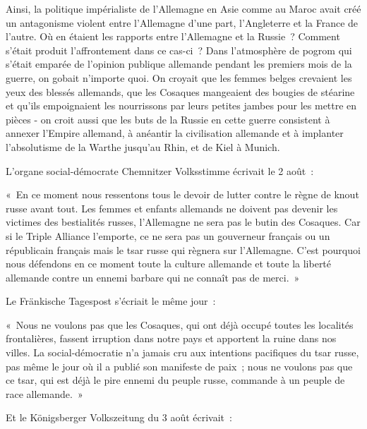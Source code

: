 \documentclass[french,twoside]{book} %
\newenvironment{quoteblock}%
  {\begin{quoting}}
  {\end{quoting}}
\newenvironment{quotebar}{%
    \def\FrameCommand{{\color{rubric!10!}\vrule width 0.5em} \hspace{0.9em}}%
    \def\OuterFrameSep{\itemsep} %
    \MakeFramed {\advance\hsize-\width \FrameRestore}
  }%
  {%
    \endMakeFramed
  }
\renewenvironment{quoteblock}%
  {%
    \savenotes
    \setstretch{0.9}
    \normalfont
    \begin{quotebar}
  }
  {%
    \end{quotebar}
    \spewnotes
  }
\begin{document}
\noindent Ainsi, la politique impérialiste de l’Allemagne en Asie comme au Maroc avait créé un antagonisme violent entre l’Allemagne d’une part, l’Angleterre et la France de l’autre. Où en étaient les rapports entre l’Allemagne et la Russie ? Comment s’était produit l’affrontement dans ce cas-ci ? Dans l’atmosphère de pogrom qui s’était emparée de l’opinion publique allemande pendant les premiers mois de la guerre, on gobait n’importe quoi. On croyait que les femmes belges crevaient les yeux des blessés allemands, que les Cosaques mangeaient des bougies de stéarine et qu’ils empoignaient les nourrissons par leurs petites jambes pour les mettre en pièces - on croit aussi que les buts de la Russie en cette guerre consistent à annexer l’Empire allemand, à anéantir la civilisation allemande et à implanter l’absolutisme de la Warthe jusqu’au Rhin, et de Kiel à Munich.\par
L'organe social-démocrate Chemnitzer Volksstimme écrivait le 2 août :\par

\begin{quoteblock}
 \noindent « En ce moment nous ressentons tous le devoir de lutter contre le règne de knout russe avant tout. Les femmes et enfants allemands ne doivent pas devenir les victimes des bestialités russes, l’Allemagne ne sera pas le butin des Cosaques. Car si le Triple Alliance l’emporte, ce ne sera pas un gouverneur français ou un républicain français mais le tsar russe qui règnera sur l’Allemagne. C'est pourquoi nous défendons en ce moment toute la culture allemande et toute la liberté allemande contre un ennemi barbare qui ne connaît pas de merci. »
\end{quoteblock}

\noindent Le Fränkische Tagespost s’écriait le même jour :\par

\begin{quoteblock}
 \noindent « Nous ne voulons pas que les Cosaques, qui ont déjà occupé toutes les localités frontalières, fassent irruption dans notre pays et apportent la ruine dans nos villes. La social-démocratie n’a jamais cru aux intentions pacifiques du tsar russe, pas même le jour où il a publié son manifeste de paix ; nous ne voulons pas que ce tsar, qui est déjà le pire ennemi du peuple russe, commande à un peuple de race allemande. »
\end{quoteblock}

\noindent Et le Königsberger Volkszeitung du 3 août écrivait :\par
\end{document}

